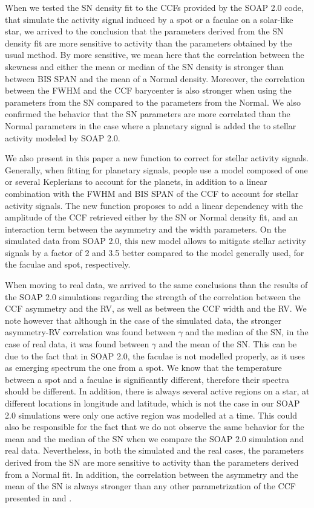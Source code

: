 \documentclass{aa}
\begin{document}
When we tested the SN density fit to the CCFs provided by the SOAP 2.0 code, that simulate the activity signal induced by a spot or a faculae on a solar-like star, we arrived to the conclusion that the parameters derived from the SN density fit are more sensitive to activity than the parameters obtained by the usual method. By more sensitive, we mean here that the correlation between the skewness and either the mean or median of the SN density is stronger than between BIS SPAN and the mean of a Normal density. Moreover, the correlation between the FWHM and the CCF barycenter is also stronger when using the parameters from the SN compared to the parameters from the Normal. We also confirmed the behavior that the SN parameters are more correlated than the Normal parameters in the case where a planetary signal is added the to stellar activity modeled by SOAP 2.0.

We also present in this paper a new function to correct for stellar activity signals. Generally, when fitting for planetary signals, people use a model composed of one or several Keplerians to account for the planets, in addition to a linear combination with the FWHM and BIS SPAN of the CCF to account for stellar activity signals. The new function proposes to add a linear dependency with the amplitude of the CCF retrieved either by the SN or Normal density fit, and an interaction term between the asymmetry and the width parameters. On the simulated data from SOAP 2.0, this new model allows to mitigate stellar activity signals by a factor of 2 and 3.5 better compared to the model generally used, for the faculae and spot, respectively.

When moving to real data, we arrived to the same conclusions than the results of the SOAP 2.0 simulations regarding the strength of the correlation between the CCF asymmetry and the RV, as well as between the CCF width and the RV. We note however that although in the case of the simulated data, the stronger asymmetry-RV correlation was found between $\gamma$ and the median of the SN, in the case of real data, it was found between $\gamma$ and the mean of the SN. This can be due to the fact that in SOAP 2.0, the faculae is not modelled properly, as it uses as emerging spectrum the one from a spot. We know that the temperature between a spot and a faculae is significantly different, therefore their spectra should be different. In addition, there is always several active regions on a star, at different locations in longitude and latitude, which is not the case in our SOAP 2.0 simulations were only one active region was modelled at a time. This could also be responsible for the fact that we do not observe the same behavior for the mean and the median of the SN when we compare the SOAP 2.0 simulation and real data. Nevertheless, in both the simulated and the real cases, the parameters derived from the SN are more sensitive to activity than the parameters derived from a Normal fit. In addition, the correlation between the asymmetry and the mean of the SN is always stronger than any other parametrization of the CCF presented in \citet{Boisse-2011} and \citet{Figueira-2013}.
\end{document}
